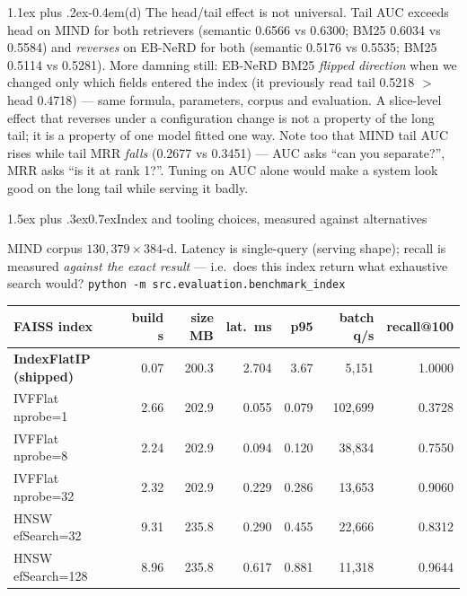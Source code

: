 \documentclass[10pt,a4paper]{article}
\makeatletter
\renewcommand\section{\@startsection{section}{1}{0pt}%
  {1.5ex plus .3ex}{0.7ex}{\normalsize\bfseries\color{accent}}}
\renewcommand\subsection{\@startsection{subsection}{2}{0pt}%
  {1.1ex plus .2ex}{-0.4em}{\normalfont\bfseries}}
\makeatother
\begin{document}
\subsection{(d) The head/tail effect is not universal.}
Tail AUC exceeds head on MIND for both retrievers (semantic 0.6566 vs 0.6300; BM25 0.6034
vs 0.5584) and \emph{reverses} on EB-NeRD for both (semantic 0.5176 vs 0.5535; BM25 0.5114
vs 0.5281). More damning still: EB-NeRD BM25 \emph{flipped direction} when we changed only
which fields entered the index (it previously read tail 0.5218 $>$ head 0.4718) --- same
formula, parameters, corpus and evaluation. A slice-level effect that reverses under a
configuration change is not a property of the long tail; it is a property of one model
fitted one way. Note too that MIND tail AUC rises while
tail MRR \emph{falls} (0.2677 vs 0.3451) --- AUC asks ``can you separate?'', MRR asks ``is
it at rank 1?''. Tuning on AUC alone would make a system look good on the long tail while
serving it badly.

\section{Index and tooling choices, measured against alternatives}

MIND corpus $130{,}379\times384$-d. Latency is single-query (serving shape); recall is
measured \emph{against the exact result} --- i.e.\ does this index return what exhaustive
search would? \texttt{python -m src.evaluation.benchmark\_index}

\begin{center}\small
\begin{tabular}{l r r r r r r}
\toprule
\textbf{FAISS index} & \textbf{build s} & \textbf{size MB} & \textbf{lat.\ ms} & \textbf{p95} & \textbf{batch q/s} & \textbf{recall@100}\\
\midrule
\textbf{IndexFlatIP (shipped)} & 0.07 & 200.3 & 2.704 & 3.67 & 5{,}151 & 1.0000\\
IVFFlat nprobe=1   & 2.66 & 202.9 & 0.055 & 0.079 & 102{,}699 & \textcolor{bad}{0.3728}\\
IVFFlat nprobe=8   & 2.24 & 202.9 & 0.094 & 0.120 & 38{,}834  & 0.7550\\
IVFFlat nprobe=32  & 2.32 & 202.9 & 0.229 & 0.286 & 13{,}653  & 0.9060\\
HNSW efSearch=32   & 9.31 & 235.8 & 0.290 & 0.455 & 22{,}666  & 0.8312\\
HNSW efSearch=128  & 8.96 & 235.8 & 0.617 & 0.881 & 11{,}318  & 0.9644\\
\bottomrule
\end{tabular}
\end{center}
\end{document}
